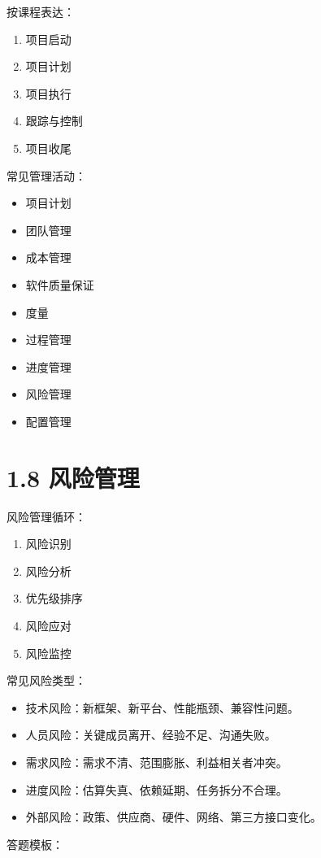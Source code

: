 \documentclass[UTF8,zihao=-4]{ctexart}
\begin{document}
按课程表达：

\begin{enumerate}
\item 项目启动
\item 项目计划
\item 项目执行
\item 跟踪与控制
\item 项目收尾
\end{enumerate}

常见管理活动：

\begin{itemize}
\item 项目计划
\item 团队管理
\item 成本管理
\item 软件质量保证
\item 度量
\item 过程管理
\item 进度管理
\item 风险管理
\item 配置管理
\end{itemize}

\section{1.8 风险管理}

风险管理循环：

\begin{enumerate}
\item 风险识别
\item 风险分析
\item 优先级排序
\item 风险应对
\item 风险监控
\end{enumerate}

常见风险类型：

\begin{itemize}
\item 技术风险：新框架、新平台、性能瓶颈、兼容性问题。
\item 人员风险：关键成员离开、经验不足、沟通失败。
\item 需求风险：需求不清、范围膨胀、利益相关者冲突。
\item 进度风险：估算失真、依赖延期、任务拆分不合理。
\item 外部风险：政策、供应商、硬件、网络、第三方接口变化。
\end{itemize}

答题模板：
\end{document}
